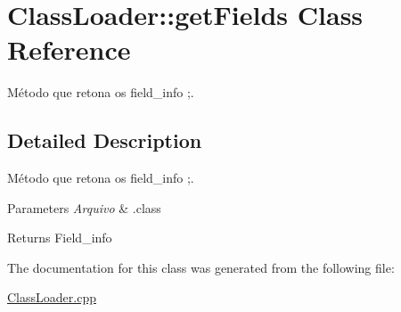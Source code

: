 \hypertarget{class_class_loader_1_1get_fields}{}\section{Class\+Loader\+:\+:get\+Fields Class Reference}
\label{class_class_loader_1_1get_fields}


Método que retona os field\+\_\+info ;.  




\subsection{Detailed Description}
Método que retona os field\+\_\+info ;. 


\begin{DoxyParams}{Parameters}
{\em Arquivo} & .class \\
\hline
\end{DoxyParams}
\begin{DoxyReturn}{Returns}
Field\+\_\+info 
\end{DoxyReturn}


The documentation for this class was generated from the following file\+:\begin{DoxyCompactItemize}
\item 
\hyperlink{_class_loader_8cpp}{Class\+Loader.\+cpp}\end{DoxyCompactItemize}
